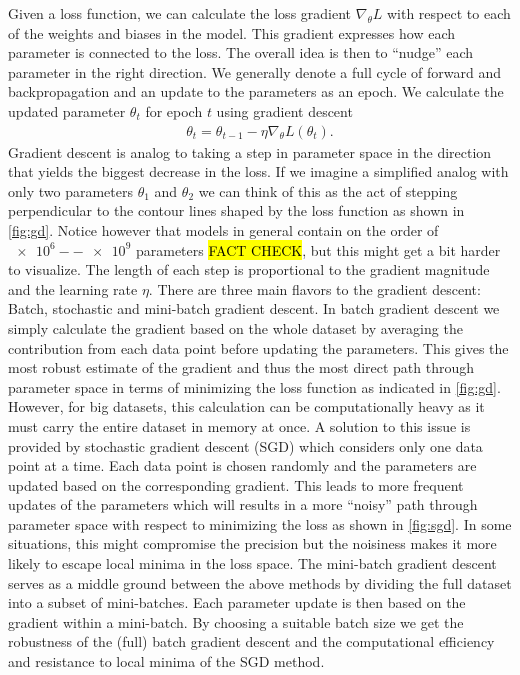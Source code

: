 Given a loss function, we can calculate the loss gradient $\nabla_\theta L$ with respect to each of the weights and biases in the model. This gradient expresses how each parameter is connected to the loss. The overall idea is then to  ``nudge'' each parameter in the right direction. We generally denote a full cycle of forward and backpropagation and an update to the parameters as an epoch. We calculate the updated parameter $\theta_t$ for epoch $t$ using gradient descent 
\begin{align*}
  \theta_{t} = \theta_{t-1} - \eta \nabla_\theta L(\theta_t).
\end{align*}
Gradient descent is analog to taking a step in parameter space in the direction
that yields the biggest decrease in the loss. If we imagine a simplified analog
with only two parameters $\theta_1$ and $\theta_2$ we can think of this as the
act of stepping perpendicular to the contour lines shaped by the loss function
as shown in \cref{fig:gd}. Notice however that models in general contain on the order of $\num{e6}--\num{e9}$ parameters \hl{FACT CHECK}, but this might get a bit harder to visualize. The length of each step is proportional to the gradient magnitude and the learning rate $\eta$. There are three main flavors to the gradient descent: Batch,
stochastic and mini-batch gradient descent. In batch gradient descent we simply
calculate the gradient based on the whole dataset by averaging the contribution
from each data point before updating the parameters. This gives the most robust estimate of the gradient and thus the most direct path through parameter space in terms of minimizing the loss function as
indicated in \cref{fig:gd}. However, for big datasets, this calculation can be
computationally heavy as it must carry the entire dataset in memory at once. A
solution to this issue is provided by stochastic gradient descent
(\acrshort{SGD}) which considers only one data point at a time. Each data point is chosen randomly and the parameters are updated based on the corresponding gradient. This leads to more frequent updates of the parameters which will results
in a more ``noisy'' path through parameter space with respect to minimizing the
loss as shown in \cref{fig:sgd}. In some situations, this might compromise the
precision but the noisiness makes it more likely to escape local minima in the loss space. The mini-batch gradient descent serves as a middle ground between the above methods by dividing the full dataset into a subset of mini-batches. Each parameter update is then based on the gradient within a mini-batch. By choosing a suitable batch size we get the robustness of the (full) batch gradient descent and the computational efficiency and resistance to local minima of the \acrshort{SGD} method. 


